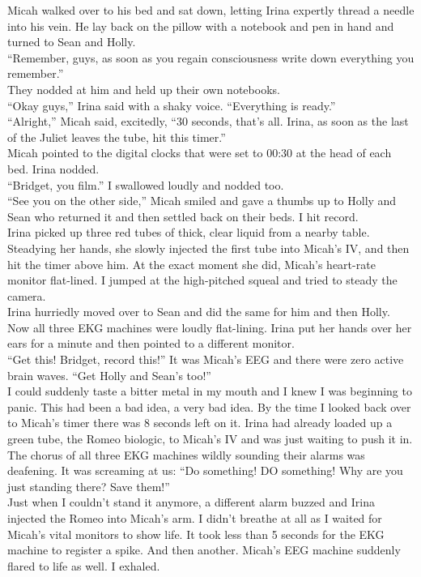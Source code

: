 \documentclass[a5paper]{scrartcl}
\begin{document}
Micah walked over to his bed and sat down, letting Irina expertly thread a needle into his vein. He lay back on the pillow with a notebook and pen in hand and turned to Sean and Holly.\\
\enquote{Remember, guys, as soon as you regain consciousness write down everything you remember.}\\
They nodded at him and held up their own notebooks.\\
\enquote{Okay guys,} Irina said with a shaky voice. \enquote{Everything is ready.}\\
\enquote{Alright,” Micah said, excitedly, “30 seconds, that's all. Irina, as soon as the last of the Juliet leaves the tube, hit this timer.}\\
Micah pointed to the digital clocks that were set to 00:30 at the head of each bed. Irina nodded.\\
\enquote{Bridget, you film.} I swallowed loudly and nodded too.\\
\enquote{See you on the other side,} Micah smiled and gave a thumbs up to Holly and Sean who returned it and then settled back on their beds. I hit record.\\
Irina picked up three red tubes of thick, clear liquid from a nearby table. Steadying her hands, she slowly injected the first tube into Micah's IV, and then hit the timer above him. At the exact moment she did, Micah's heart-rate monitor flat-lined. I jumped at the high-pitched squeal and tried to steady the camera.\\
Irina hurriedly moved over to Sean and did the same for him and then Holly. Now all three EKG machines were loudly flat-lining. Irina put her hands over her ears for a minute and then pointed to a different monitor.\\
\enquote{Get this! Bridget, record this!} It was Micah's EEG and there were zero active brain waves. \enquote{Get Holly and Sean's too!}\\
I could suddenly taste a bitter metal in my mouth and I knew I was beginning to panic. This had been a bad idea, a very bad idea. By the time I looked back over to Micah's timer there was 8 seconds left on it. Irina had already loaded up a green tube, the Romeo biologic, to Micah's IV and was just waiting to push it in.\\
The chorus of all three EKG machines wildly sounding their alarms was deafening. It was screaming at us: “Do something! DO something! Why are you just standing there? Save them!”\\
Just when I couldn’t stand it anymore, a different alarm buzzed and Irina injected the Romeo into Micah’s arm. I didn't breathe at all as I waited for Micah's vital monitors to show life. It took less than 5 seconds for the EKG machine to register a spike. And then another. Micah's EEG machine suddenly flared to life as well. I exhaled.\\
\end{document}
